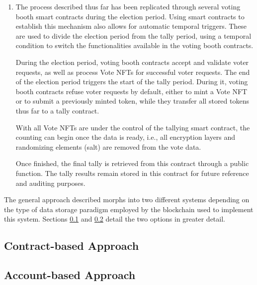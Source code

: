 \documentclass[../main.tex]{subfiles}
\begin{document}
\begin{enumerate}
    \item{The process described thus far has been replicated through several voting booth smart contracts during the election period. Using smart contracts to establish this mechanism also allows for automatic temporal triggers. These are used to divide the election period from the tally period, using a temporal condition to switch the functionalities available in the voting booth contracts.
          \par
          During the election period, voting booth contracts accept and validate voter requests, as well as process Vote NFTs for successful voter requests. The end of the election period triggers the start of the tally period. During it, voting booth contracts refuse voter requests by default, either to mint a Vote NFT or to submit a previously minted token, while they transfer all stored tokens thus far to a tally contract.
          \par
          With all Vote NFTs are under the control of the tallying smart contract, the counting can begin once the data is ready, i.e., all encryption layers and randomizing elements (salt) are removed from the vote data.
          \par
          Once finished, the final tally is retrieved from this contract through a public function. The tally results remain stored in this contract for future reference and auditing purposes.}
\end{enumerate}

The general approach described morphs into two different systems depending on the type of data storage paradigm employed by the blockchain used to implement this system. Sections \ref{contract-based-approach} and \ref{account-based-approach} detail the two options in greater detail.

\subsection{Contract-based Approach}
\label{contract-based-approach}


\subsection{Account-based Approach}
\label{account-based-approach}

\end{document}
